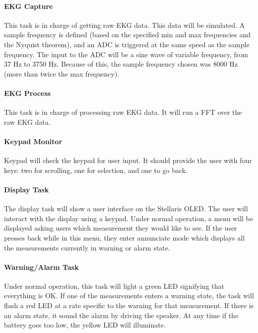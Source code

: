 \documentclass[12pt]{article} %
\begin{document}
    \paragraph{EKG Capture} This task is in charge of getting raw EKG data.  This data
    will be simulated.  A sample frequency is defined (based on the specified min and max
    frequencies and the Nyquist theorem), and an ADC is triggered at the same speed as
    the sample frequency.  The input to the ADC will be a sine wave of variable
    frequency, from 37 Hz to 3750 Hz.  Because of this, the sample frequency
    chosen was 8000 Hz (more than twice the max frequency).

    \paragraph{EKG Process} This task is in charge of processing raw EKG data.
    It will run a FFT over the raw EKG data.

    \paragraph{Keypad Monitor} Keypad will check the keypad for user input. It
    should provide the user with four keys: two for scrolling, one for selection,
    and one to go back.

    \paragraph{Display Task} The display task will show a user interface on the
    Stellaris OLED. The user will interact with the display using a keypad. Under
    normal operation, a menu will be displayed asking users which measurement they
    would like to see. If the user presses back while in this menu, they enter
    annunciate mode which displays all the measurements currently in warning or
    alarm state.

    \paragraph{Warning/Alarm Task} Under normal operation, this task will light a
    green LED signifying that everything is OK. If one of the measurements enters
    a warning state, the task will flash a red LED at a rate specific to the
    warning for that measurement. If there is an alarm state, it sound the alarm
    by driving the speaker. At any time if the battery goes too low, the yellow
    LED will illuminate.
\end{document}
